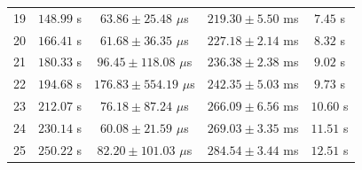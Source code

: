 \begin{table}[htbp]
\begin{tabular}{|c|c|c|c|c|}
19 & $148.99$ s & $63.86 \pm 25.48$ $\mu$s & $219.30 \pm 5.50$ ms & $7.45$ s \\
20 & $166.41$ s & $61.68 \pm 36.35$ $\mu$s & $227.18 \pm 2.14$ ms & $8.32$ s \\
21 & $180.33$ s & $96.45 \pm 118.08$ $\mu$s & $236.38 \pm 2.38$ ms & $9.02$ s \\
22 & $194.68$ s & $176.83 \pm 554.19$ $\mu$s & $242.35 \pm 5.03$ ms & $9.73$ s \\
23 & $212.07$ s & $76.18 \pm 87.24$ $\mu$s & $266.09 \pm 6.56$ ms & $10.60$ s \\
24 & $230.14$ s & $60.08 \pm 21.59$ $\mu$s & $269.03 \pm 3.35$ ms & $11.51$ s \\
25 & $250.22$ s & $82.20 \pm 101.03$ $\mu$s & $284.54 \pm 3.44$ ms & $12.51$ s \\
\hline
\end{tabular}
\end{table}